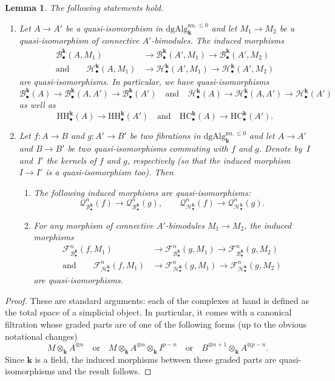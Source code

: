 \documentclass[11pt]{article}
\let\mathcal\mathscr
\newenvironment{assertions}
{\bgroup\def\theenumi{\alph{enumi}}\begin{enumerate}}
{\end{enumerate}\egroup}
\newcommand{\sbullet}{{\scriptscriptstyle\bullet}}
\newtheorem{lem}[thm]{Lemma}
\theoremstyle{definition}
\newcommand{\Bc}{\mathcal{B}}
\newcommand{\Qc}{\mathcal{Q}}
\newcommand{\Hc}{\mathcal{H}}
\newcommand{\Fc}{\mathcal{F}}
\newcommand{\MCdgAlg}{\mathrm{dgAlg}}
\newcommand{\HC}{\mathrm{HC}}
\newcommand{\HH}{\mathrm{HH}}
\renewcommand{\k}{{\boldsymbol{k}}}
\begin{document}
\pagebreak[2]
\begin{lem} The following statements hold.
\begin{enumerate}
\item Let $A \to A'$ be a quasi-isomorphism in $\MCdgAlg_\k^{\mathrm{nu},\leq 0}$ and let $M_1 \to M_2$ be a quasi-isomorphism of connective $A'$-bimodules.
The induced morphisms
\begin{align*}
\Bc_\sbullet^\k(A,M_1) &\to \Bc_\sbullet^\k(A',M_1) \to \Bc_\sbullet^\k(A',M_2) \\
\text{and}\qquad \Hc_\sbullet^\k(A,M_1) &\to \Hc_\sbullet^\k(A',M_1) \to \Hc_\sbullet^\k(A',M_2)
\end{align*}
are quasi-isomorphisms.
In particular, we have quasi-isomorphisms
\[
\Bc_\sbullet^\k(A) \to \Bc_\sbullet^\k(A,A') \to \Bc_\sbullet^\k(A')\quad\text{and}\quad\Hc_\sbullet^\k(A) \to \Hc_\sbullet^\k(A,A') \to \Hc_\sbullet^\k(A')
\]
as well as
\[
\HH_\sbullet^\k(A) \to \HH_\sbullet^\k(A')\quad\text{and}\quad\HC_\sbullet^\k(A) \to \HC_\sbullet^\k(A').
\]

\item Let $f \colon A \to B$ and $g \colon A' \to B'$ be two fibrations in $\MCdgAlg_\k^{\mathrm{nu},\leq 0}$ and let $A \to A'$ and $B \to B'$ be two quasi-isomorphisms commuting with $f$ and $g$. Denote by~$I$ and~$I'$ the kernels of $f$ and $g$, respectively (so that the induced morphism $I \to I'$ is a quasi-isomorphism too). Then
\begin{assertions}
\item The following induced morphisms are quasi-isomorphisms:
\[
\Qc_{\Bc_\sbullet^\k}^n(f) \to \Qc_{\Bc_\sbullet^\k}^n(g), \qquad \Qc_{\Hc_\sbullet^\k}^n(f) \to \Qc_{\Hc_\sbullet^\k}^n(g).
\]
\item For any morphism of connective $A'$-bimodules $M_1 \to M_2$, the induced morphisms
\begin{align*}
\Fc_{\Bc_\sbullet^\k}^{n}(f,M_1) &\to \Fc_{\Bc_\sbullet^\k}^{n}(g,M_1) \to \Fc_{\Bc_\sbullet^\k}^{n}(g,M_2) \\
\text{and}\qquad
\Fc_{\Hc_\sbullet^\k}^{n}(f,M_1) &\to \Fc_{\Hc_\sbullet^\k}^{n}(g,M_1) \to \Fc_{\Hc_\sbullet^\k}^{n}(g,M_2)
\end{align*}
are quasi-isomorphisms.
\end{assertions}
\end{enumerate}
\end{lem}

\begin{proof}
These are standard arguments: each of the complexes at hand is defined as the total space of a simplicial object. In particular, it comes with a canonical filtration whose graded parts are of one of the following forms (up to the obvious notational changes)
\[
M \otimes_\k A^{\otimes n} \quad\text{or}\quad M \otimes_\k A^{\otimes n} \otimes_\k I^{p-n} \quad\text{or}\quad B^{\otimes n+1} \otimes_\k A^{\otimes p-n}.
\]
Since $\k$ is a field, the induced morphisms between these graded parts are quasi-isomorphisms and the result follows.
\end{proof}
\end{document}
